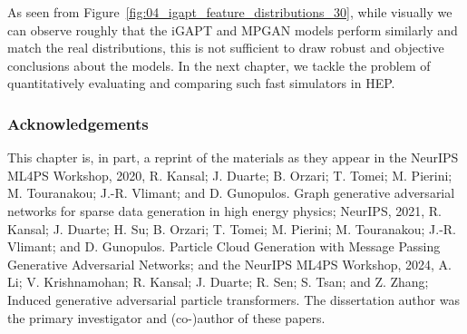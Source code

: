 As seen from Figure~\ref{fig:04_igapt_feature_distributions_30}, while visually we can observe roughly that the iGAPT and MPGAN models perform similarly and match the real distributions, this is not sufficient to draw robust and objective conclusions about the models.
In the next chapter, we tackle the problem of quantitatively evaluating and comparing such fast simulators in HEP.

\subsubsection{Acknowledgements}

This chapter is, in part, a reprint of the materials as they appear in the NeurIPS ML4PS Workshop, 2020, R. Kansal; J. Duarte; B. Orzari; T. Tomei; M. Pierini; M. Touranakou; J.-R. Vlimant; and D. Gunopulos. Graph generative adversarial networks for sparse data generation in high energy physics;
NeurIPS, 2021, R. Kansal; J. Duarte; H. Su; B. Orzari; T. Tomei; M. Pierini; M. Touranakou; J.-R. Vlimant; and D. Gunopulos. Particle Cloud Generation with Message Passing Generative Adversarial Networks; and
the NeurIPS ML4PS Workshop, 2024, A. Li; V. Krishnamohan; R. Kansal; J. Duarte; R. Sen; S. Tsan; and Z. Zhang; Induced generative adversarial particle transformers.
The dissertation author was the primary investigator and (co-)author of these papers.
